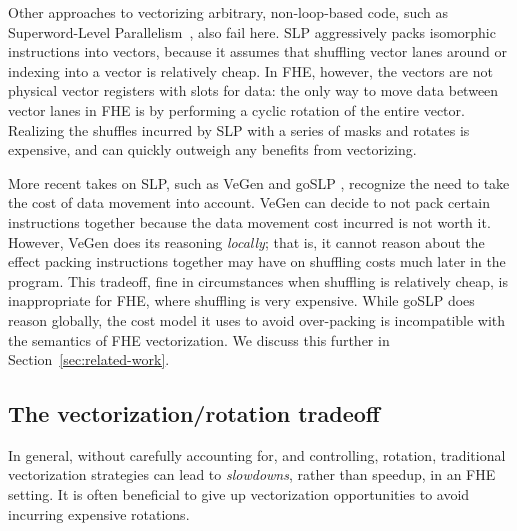Other approaches to vectorizing arbitrary, non-loop-based code, such as Superword-Level Parallelism~\cite{SLP}, also fail here.
SLP aggressively packs isomorphic instructions into vectors, because it assumes that shuffling vector lanes around or indexing into a vector is relatively cheap.
In FHE, however, the vectors are not physical vector registers with slots for data: %
the only way to move data between vector lanes in FHE is by performing a cyclic rotation of the entire vector.
Realizing the shuffles incurred by SLP with a series of masks and rotates is expensive, and can quickly outweigh any benefits from vectorizing.

More recent takes on SLP, such as VeGen \cite{VeGen} and goSLP \cite{goSLP}, recognize the need to take the cost of data movement into account.
VeGen 
can decide to not pack certain instructions together because the data movement cost incurred is not worth it.
However, VeGen does its reasoning {\em locally}; that is, it cannot reason about the effect packing instructions together may have on shuffling costs much later in the program. This tradeoff, fine in circumstances when shuffling is relatively cheap, is inappropriate for FHE, where shuffling is very expensive.
While goSLP does reason globally, the cost model it uses to avoid over-packing is incompatible with the semantics of FHE vectorization.
We discuss this further in Section~\ref{sec:related-work}.

\subsection*{The vectorization/rotation tradeoff}

In general, without carefully accounting for, and controlling, rotation, traditional vectorization strategies can lead to {\em slowdowns}, rather than speedup, in an FHE setting. It is often beneficial to give up vectorization opportunities to avoid incurring expensive rotations.

